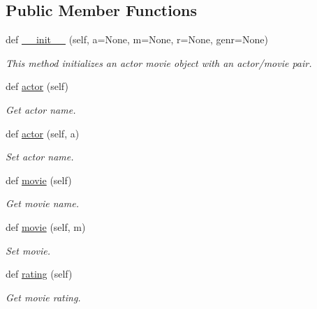 \subsection*{Public Member Functions}
\begin{DoxyCompactItemize}
\item 
def \hyperlink{classbridges_1_1data__src__dependent_1_1actor__movie__imdb_1_1_actor_movie_i_m_d_b_add733f3ecfc9282d102cee6bf5e20674}{\+\_\+\+\_\+init\+\_\+\+\_\+} (self, a=None, m=None, r=None, genr=None)
\begin{DoxyCompactList}\small\item\em This method initializes an actor movie object with an actor/movie pair. \end{DoxyCompactList}\item 
def \hyperlink{classbridges_1_1data__src__dependent_1_1actor__movie__imdb_1_1_actor_movie_i_m_d_b_aff9f7941225e72653d26171a596c6ef7}{actor} (self)
\begin{DoxyCompactList}\small\item\em Get actor name. \end{DoxyCompactList}\item 
def \hyperlink{classbridges_1_1data__src__dependent_1_1actor__movie__imdb_1_1_actor_movie_i_m_d_b_a030a7f94d4cfc3a105f4e0218a382276}{actor} (self, a)
\begin{DoxyCompactList}\small\item\em Set actor name. \end{DoxyCompactList}\item 
def \hyperlink{classbridges_1_1data__src__dependent_1_1actor__movie__imdb_1_1_actor_movie_i_m_d_b_a05c035927b682e537b0931a1951ac579}{movie} (self)
\begin{DoxyCompactList}\small\item\em Get movie name. \end{DoxyCompactList}\item 
def \hyperlink{classbridges_1_1data__src__dependent_1_1actor__movie__imdb_1_1_actor_movie_i_m_d_b_acf1fb5f37a8fa19ee503b031a20638d5}{movie} (self, m)
\begin{DoxyCompactList}\small\item\em Set movie. \end{DoxyCompactList}\item 
def \hyperlink{classbridges_1_1data__src__dependent_1_1actor__movie__imdb_1_1_actor_movie_i_m_d_b_a38ab0b7ab41a2c2c31111264de3952cb}{rating} (self)
\begin{DoxyCompactList}\small\item\em Get movie rating. \end{DoxyCompactList}\item 

\end{DoxyCompactItemize}
